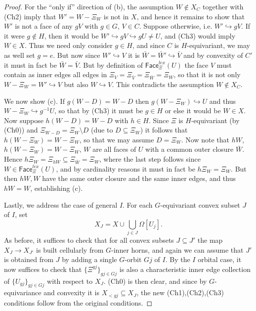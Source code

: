 \documentclass[a4paper,10pt,draft]{article}%
\begin{document}
\begin{proof}
For the ``only if'' direction of (b), the assumption $W \not \in X_C$ together with (Ch2) imply that
$W'=W-\Xi_{W}$ is not in $X$, and hence it remains to show that 
$W'$ is not a face of any $gV$ with $g\in G$, $V \in C$.
Suppose otherwise, i.e. $W' \hookrightarrow gV$.
If it were $g \not \in H$, 
then it would be $W' \hookrightarrow gV \hookrightarrow g U \neq U$, and (Ch3) would imply $W\in X$. Thus we need only consider $g\in H$, and since $C$ is $H$-equivariant, we may as well set $g=e$.
But now since $W' \hookrightarrow V$ it is $ \bar{W} = \bar{W}' \hookrightarrow \bar{V}$
and by convexity of $C'$ it must in fact be 
$ \bar{W} = \bar{V}$. But by definition of 
$\mathsf{Face}_{\Xi}^{lex}(U)$ the face $V$ must contain as inner edges all edges in 
$\Xi_V=\Xi_{\bar{V}} = \Xi_{\bar{W}} = \Xi_{W}$,
so that it is not only $W - \Xi_{W} = W' \hookrightarrow V$ but also $W \hookrightarrow V$.
This contradicts the assumption $W \not \in X_C$.

We now show (c).
If $g(W-D)=W-D$ then $g(W - \Xi_W) \hookrightarrow U$
and thus $W - \Xi_W \hookrightarrow g^{-1}U$,
so that by (Ch3) it must be $g \in H$ or else it would be $W \in X$.
Now suppose $h(W-D)=W-D$ with $h\in H$.
Since $\Xi$ is $H$-equivariant (by (Ch0)) and
$\Xi_{W-D} = \Xi_{W} \setminus D$ (due to $D \subseteq \Xi_{W}$) it follows that 
$h(W-\Xi_W)=W-\Xi_W$,
so that we may assume $D=\Xi_W$.
Now note that
$hW$, $h(W-\Xi_W)=W-\Xi_W$, $W$
are all faces of $U$ with a common outer closure $\bar{W}$.
Hence 
$h\Xi_{W} = \Xi_{hW} \subseteq \Xi_{\bar{W}} = \Xi_{W}$, where the last step follows since
$W \in \mathsf{Face}_{\Xi}^{lex}(U)$, and by cardinality reasons it must in fact be $h \Xi_{W} = \Xi_{W}$. But then $hW,W$
have the same outer closure and the same inner edges, and thus 
$hW=W$, establishing (c).

Lastly, we address the case of general $I$.
For each $G$-equivariant convex subset $J$ of $I$, set
\[
	X_J = 
	X \cup \bigcup_{j \in J} \Omega[U_j].
\]
As before, it suffices to check that for all convex subsets
$J \subseteq J'$
the map $X_J \to X_{J'}$ is built cellularly from $G$-inner horns,
and again we can assume that $J'$ is obtained from $J$ by adding a single $G$-orbit $Gj$ of $I$.
By the $I$ orbital case, it now suffices to check that
$\{\Xi^{gj}\}_{gj \in Gj}$ is also a characteristic inner edge collection of $\{U_{g j}\}_{g j \in Gj}$ with respect to $X_J$.
(Ch0) is then clear, and since by $G$-equivariance and convexity it is $X_{<gj} \subseteq X_J$,
the new (Ch1),(Ch2),(Ch3)
conditions follow from the original conditions.
\end{proof}
\end{document}

